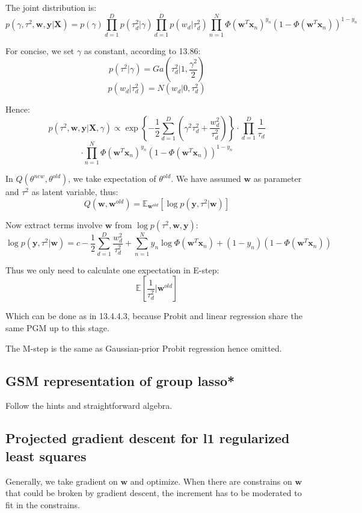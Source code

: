 \documentclass[UTF8]{ctexart}
\begin{document}
The joint distribution is:
$$p(\gamma,\tau^{2},\textbf{w},\textbf{y}|\textbf{X})=p(\gamma)\prod_{d=1}^{D}p(\tau_{d}^{2}|\gamma)\prod_{d=1}^{D}p(w_{d}|\tau_{d}^{2})\prod_{n=1}^{N}\Phi(\textbf{w}^{T}\textbf{x}_{n})^{y_{n}}(1-\Phi(\textbf{w}^{T}\textbf{x}_{n}))^{1-y_{n}}$$

For concise, we set $\gamma$ as constant, according to 13.86:
$$p(\tau^{2}|\gamma)=Ga(\tau_{d}^{2}|1,\frac{\gamma^{2}}{2})$$
$$p(w_{d}|\tau_{d}^{2})=N(w_{d}|0,\tau_{d}^{2})$$

Hence:
$$p(\tau^{2},\textbf{w},\textbf{y}|\textbf{X},\gamma)\propto \exp\left\{ -\frac{1}{2}\sum_{d=1}^{D}(\gamma^{2}\tau_{d}^{2} + \frac{w_{d}^{2}}{\tau_{d}^{2}}) \right\}\cdot \prod_{d=1}^{D}\frac{1}{\tau_{d}}$$
$$\cdot \prod_{n=1}^{N}\Phi(\textbf{w}^{T}\textbf{x}_{n})^{y_{n}}(1-\Phi(\textbf{w}^{T}\textbf{x}_{n}))^{1-y_{n}}$$

In $Q(\theta^{new},\theta^{old})$, we take expectation of $\theta^{old}$. We have assumed $\textbf{w}$ as parameter and $\tau^{2}$ as latent variable, thus:
$$Q(\textbf{w},\textbf{w}^{old})=\mathbb{E}_{\textbf{w}^{old}}[\log p(\textbf{y},\tau^{2}|\textbf{w})]$$

Now extract terms involve $\textbf{w}$ from $\log p(\tau^{2},\textbf{w},\textbf{y})$:
$$\log p(\textbf{y},\tau^{2}|\textbf{w}) = c -\frac{1}{2}\sum_{d=1}^{D} \frac{w_{d}^{2}}{\tau_{d}^{2}} + \sum_{n=1}^{N} y_{n}\log \Phi(\textbf{w}^{T}\textbf{x}_{n}) + (1-y_{n})(1-\Phi(\textbf{w}^{T}\textbf{x}_{n}))$$

Thus we only need to calculate one expectation in E-step:
$$\mathbb{E}[\frac{1}{\tau_{d}^{2}}|\textbf{w}^{old}]$$

Which can be done as in 13.4.4.3, because Probit and linear regression share the same PGM up to this stage.

The M-step is the same as Gaussian-prior Probit regression hence omitted.

\subsection{GSM representation  of group lasso*}
Follow the hints and straightforward algebra.

\subsection{Projected gradient descent for l1 regularized least squares}
Generally, we take gradient on $\textbf{w}$ and optimize. When there are constrains on $\textbf{w}$ that could be broken by gradient descent, the increment has to be moderated to fit in the constrains.
\end{document}
